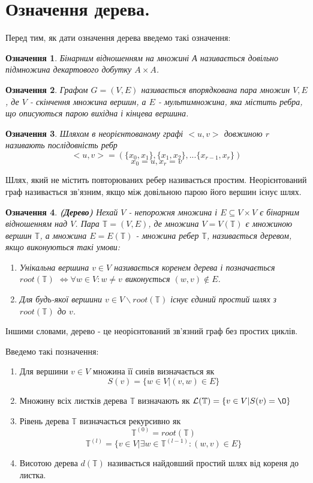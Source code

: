 \documentclass[12pt]{report}
\begin{document}
	\section{Означення дерева.}
	\hspace{0.8cm}Перед тим, як дати означення дерева введемо такі означення:
	\newtheorem{Def}{Означення}[chapter]
	\begin{Def}
	 Бінарним відношенням на множині А називається довільно підмножина декартового добутку $A\times A$.
	 \end{Def}
	 \begin{Def}
	 Графом $G=(V,E)$ називається впорядкована пара множин $V,E$, де $V$ - скінчення множина вершин, а $E$ - мультимножина, яка містить ребра, що описуються парою вихідна і кінцева вершина.
	 \end{Def}
	 \begin{Def}
	  Шляхом в неорієнтованому графі $<u,v>$ довжиною $r$ називають послідовність ребр
	$$<u,v>=(\{x_0,x_1\},\{x_1,x_2\},...\{x_{r-1},x_r\})$$
	$$x_0=u,x_r=v$$
	\end{Def}
	Шлях, який не містить повторюваних ребер називається простим.\newline
	Неорієнтований граф називається зв'язним, якщо між довільною парою його вершин існує шлях.
	\begin{Def}
	{\bf (Дерево)} Нехай $V$ - непорожня множина і $E\subseteq V\times V$ є бінарним відношенням над $V$. Пара $\mathbb{T}=(V,E)$, де множина $V=V(\mathbb{T})$ є множиною вершин $\mathbb{T}$, а множина $E=E(\mathbb{T})$ - множина ребер $\mathbb{T}$, називається деревом, якщо виконуються такі умови:
	\begin{enumerate}
		\item[-] Унікальна вершина $v\in V$ називається коренем дерева і позначається $root(\mathbb{T})$ $\Leftrightarrow \forall w\in V:w\not=v$ виконується $(w,v)\not\in E$.
		\item[-] Для будь-якої вершини $v\in V\backslash root(\mathbb{T})$ існує єдиний простий шлях з $root(\mathbb{T})$ до $v$.
	\end{enumerate}
	\end{Def}
	Іншими словами, дерево - це неорієнтований зв'язний граф без простих циклів.
	\par Введемо такі позначення:
	\begin{enumerate}
		\item[$\bullet$] Для вершини $v\in V$ множина її синів визначається як $$S(v)=\{w\in V |(v,w)\in E \}$$
		\item[$\bullet$] Множину всіх листків дерева $\mathbb{T}$ визначають як $\mathcal{L}(\mathbb{T})=\{v\in V|S(v)=\O \}$
		\item[$\bullet$] Рівень дерева $\mathbb{T}$ визначається рекурсивно як $$\mathbb{T}^{(0)}=root(\mathbb{T})$$
		$$\mathbb{T}^{(l)}=\{v \in V|\exists w\in \mathbb{T}^{(l-1)}:(w,v)\in E\}$$
		\item[$\bullet$] Висотою дерева $d(\mathbb{T})$ називається найдовший простий шлях від кореня до листка.
	\end{enumerate}
\end{document}

